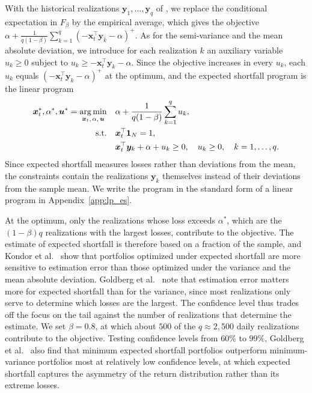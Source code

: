With the historical realizations $\bm{y}_1, \dots, \bm{y}_q$ of , we replace the conditional
expectation in $F_\beta$ by the empirical average, which gives the objective
$\alpha + \frac{1}{q(1-\beta)} \sum_{k=1}^q (-\bm{x}_t^\top \bm{y}_k - \alpha)^+$. As for the semi-variance and the
mean absolute deviation, we introduce for each realization $k$ an auxiliary variable $u_k \ge 0$ subject to
$u_k \ge -\bm{x}_t^\top \bm{y}_k - \alpha$. Since the objective increases in every $u_k$, each $u_k$ equals
$(-\bm{x}_t^\top \bm{y}_k - \alpha)^+$ at the optimum, and the expected shortfall program is the linear program
\begin{equation*}
\begin{aligned}
    \bm{x}_t^*, \alpha^*, \bm{u}^* = \operatorname*{arg\,min}_{\bm{x}_t,\, \alpha,\, \bm{u}} \quad
    & \alpha + \frac{1}{q(1-\beta)} \sum_{k=1}^q u_k, \\
    \text{s.t.} \quad & \bm{x}_t^\top \bm{1}_N = 1, \\
    & \bm{x}_t^\top \bm{y}_k + \alpha + u_k \ge 0, \quad u_k \ge 0, \quad k = 1, \dots, q.
\end{aligned}
\end{equation*}
Since expected shortfall measures losses rather than deviations from the mean, the constraints contain the realizations
$\bm{y}_k$ themselves instead of their deviations from the sample mean. We write the program in the standard form of a
linear program in Appendix~\ref{app:lp_es}.

At the optimum, only the realizations whose loss exceeds $\alpha^*$, which are the $(1-\beta) q$ realizations with
the largest losses, contribute to the objective. The estimate of expected shortfall is therefore based on a fraction of the
sample, and Kondor et al.~\cite{kondor2007noise} show that portfolios optimized under expected shortfall are more
sensitive to estimation error than those optimized under the variance and the mean absolute deviation. Goldberg et
al.~\cite{goldberg2013minimizingshortfall} note that estimation error matters more for expected shortfall than for the
variance, since most realizations only serve to determine which losses are the largest. The confidence level thus
trades off the focus on the tail against the number of realizations that determine the estimate. We set $\beta = 0.8$,
at which about $500$ of the $q \approx 2{,}500$ daily realizations contribute to the objective. Testing confidence levels from $60\%$ to $99\%$, Goldberg et al.~\cite{goldberg2013minimizingshortfall} also find
that minimum expected shortfall portfolios outperform minimum-variance portfolios most at relatively low confidence
levels, at which expected shortfall captures the asymmetry of the return distribution rather than its extreme losses.

